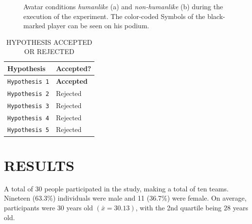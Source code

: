 \documentclass[sigchi]{acmart}
\begin{document}
\begin{figure}[H]
  \centering
  \qquad
  \caption[The avatars in the experimental environment]{Avatar conditions \textit{humanlike} (a) and \textit{non-humanlike} (b) during the execution of the experiment. The color-coded Symbols of the black-marked player can be seen on his podium.}
  \label{AvatareImEinsatz}
\end{figure}

\begin{table}
  \caption{HYPOTHESIS ACCEPTED OR REJECTED}
  \label{AcceptOrReject}
  \begin{tabular}{ll}
    \toprule
    Hypothesis & Accepted? \\
    \midrule
     \texttt{Hypothesis 1} & \textbf{Accepted} \\
     \texttt{Hypothesis 2} & Rejected \\
     \texttt{Hypothesis 3} & Rejected \\
     \texttt{Hypothesis 4} & Rejected \\
     \texttt{Hypothesis 5} & Rejected \\
    \bottomrule
  \end{tabular}
\end{table}

\section{RESULTS}
A total of 30 people participated in the study, making a total of ten teams. Nineteen (63.3\%) individuals were male and 11 (36.7\%) were female. On average, participants were 30 years old $(\bar{x} = 30.13)$, with the 2nd quartile being $28$ years old.
\end{document}
